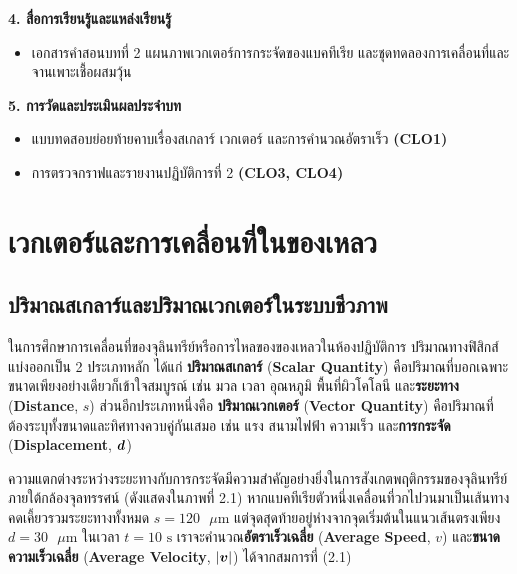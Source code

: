 \begin{planbox}
\noindent\textbf{4. สื่อการเรียนรู้และแหล่งเรียนรู้}
\begin{itemize}
    \item เอกสารคำสอนบทที่ 2 แผนภาพเวกเตอร์การกระจัดของแบคทีเรีย และชุดทดลองการเคลื่อนที่และจานเพาะเชื้อผสมวุ้น
\end{itemize}

\noindent\textbf{5. การวัดและประเมินผลประจำบท}
\begin{itemize}
    \item แบบทดสอบย่อยท้ายคาบเรื่องสเกลาร์ เวกเตอร์ และการคำนวณอัตราเร็ว \textbf{(CLO1)}
    \item การตรวจกราฟและรายงานปฏิบัติการที่ 2 \textbf{(CLO3, CLO4)}
\end{itemize}
\end{planbox}
\clearpage

\chapter{เวกเตอร์และการเคลื่อนที่ในของเหลว}

\section{ปริมาณสเกลาร์และปริมาณเวกเตอร์ในระบบชีวภาพ}


ในการศึกษาการเคลื่อนที่ของจุลินทรีย์หรือการไหลของของเหลวในห้องปฏิบัติการ ปริมาณทางฟิสิกส์แบ่งออกเป็น 2 ประเภทหลัก ได้แก่ \textbf{ปริมาณสเกลาร์} (\textbf{Scalar Quantity}) คือปริมาณที่บอกเฉพาะขนาดเพียงอย่างเดียวก็เข้าใจสมบูรณ์ เช่น มวล เวลา อุณหภูมิ พื้นที่ผิวโคโลนี และ\textbf{ระยะทาง} (\textbf{Distance}, $s$) ส่วนอีกประเภทหนึ่งคือ \textbf{ปริมาณเวกเตอร์} (\textbf{Vector Quantity}) คือปริมาณที่ต้องระบุทั้งขนาดและทิศทางควบคู่กันเสมอ เช่น แรง สนามไฟฟ้า ความเร็ว และ\textbf{การกระจัด} (\textbf{Displacement}, $\bm{d}$)

ความแตกต่างระหว่างระยะทางกับการกระจัดมีความสำคัญอย่างยิ่งในการสังเกตพฤติกรรมของจุลินทรีย์ภายใต้กล้องจุลทรรศน์ (ดังแสดงใน\mbox{ภาพที่} 2.1) หากแบคทีเรียตัวหนึ่งเคลื่อนที่วกไปวนมาเป็นเส้นทางคดเคี้ยวรวมระยะทางทั้งหมด $s = 120\text{ }\mu\text{m}$ แต่จุดสุดท้ายอยู่ห่างจากจุดเริ่มต้นในแนวเส้นตรงเพียง $d = 30\text{ }\mu\text{m}$ ในเวลา $t = 10\text{ s}$ เราจะคำนวณ\textbf{อัตราเร็วเฉลี่ย} (\textbf{Average Speed}, $v$) และ\textbf{ขนาดความเร็วเฉลี่ย} (\textbf{Average Velocity}, $|\bm{v}|$) ได้จากสมการที่ (2.1)

